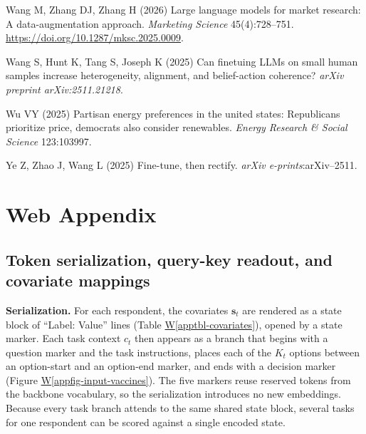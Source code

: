 \documentclass[
  11pt,
  letterpaper,
]{article}
\newlength{\cslhangindent}
\newenvironment{CSLReferences}[2] %
 {\begin{list}{}{%
  \setlength{\itemindent}{0pt}
  \setlength{\leftmargin}{0pt}
  \setlength{\parsep}{0pt}
  \ifodd #1
   \setlength{\leftmargin}{\cslhangindent}
   \setlength{\itemindent}{-1\cslhangindent}
  \fi
  \setlength{\itemsep}{#2\baselineskip}}}
 {\end{list}}
\newcommand*\quartoapptblref[1]{Table \hyperref[#1]{W\ref{#1}}}
\newcommand*\quartoappfigref[1]{Figure \hyperref[#1]{W\ref{#1}}}
\begin{document}
\begin{CSLReferences}{1}{0}
Wang M, Zhang DJ, Zhang H (2026) Large language models for market
research: A data-augmentation approach. \emph{Marketing Science}
45(4):728--751. \url{https://doi.org/10.1287/mksc.2025.0009}.

Wang S, Hunt K, Tang S, Joseph K (2025) Can finetuing LLMs on small
human samples increase heterogeneity, alignment, and belief-action
coherence? \emph{arXiv preprint arXiv:2511.21218}.

Wu VY (2025) Partisan energy preferences in the united states:
Republicans prioritize price, democrats also consider renewables.
\emph{Energy Research \& Social Science} 123:103997.

Ye Z, Zhao J, Wang L (2025) Fine-tune, then rectify. \emph{arXiv
e-prints}:arXiv--2511.

\end{CSLReferences}

\newpage{}

\section*{Web Appendix}\label{web-appendix}

\subsection*{Token serialization, query-key readout, and covariate
mappings}\label{token-serialization-query-key-readout-and-covariate-mappings}

\textbf{Serialization.} For each respondent, the covariates
\(\mathbf{s}_t\) are rendered as a state block of ``Label: Value'' lines
(\quartoapptblref{apptbl-covariates}), opened by a state marker. Each
task context \(c_t\) then appears as a branch that begins with a
question marker and the task instructions, places each of the \(K_t\)
options between an option-start and an option-end marker, and ends with
a decision marker (\quartoappfigref{appfig-input-vaccines}). The five
markers reuse reserved tokens from the backbone vocabulary, so the
serialization introduces no new embeddings. Because every task branch
attends to the same shared state block, several tasks for one respondent
can be scored against a single encoded state.
\end{document}

